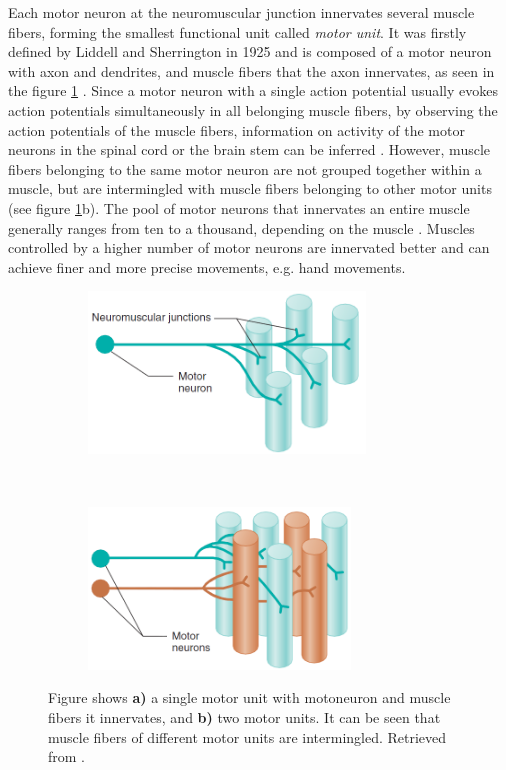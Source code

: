 Each motor neuron at the neuromuscular junction innervates several muscle fibers, forming the smallest functional unit called \emph{motor unit}. It was firstly defined by Liddell and Sherrington in 1925 \citep{Liddell1925, Sherrington1925} and is composed of a motor neuron with axon and dendrites, and muscle fibers that the axon innervates, as seen in the figure \ref{fig:motor units} \citep{Duchateau2011}. Since a motor neuron with a single action potential usually evokes action potentials simultaneously in all belonging muscle fibers, by observing the action potentials of the muscle fibers, information on activity of the motor neurons in the spinal cord or the brain stem can be inferred \citep{Merletti-Farina-book}. However, muscle fibers belonging to the same motor neuron are not grouped together within a muscle, but are intermingled with muscle fibers belonging to other motor units (see figure \ref{fig:motor units}b). The pool of motor neurons that innervates an entire muscle generally ranges from ten to a thousand, depending on the muscle \citep{Merletti-Farina-book}. Muscles controlled by a higher number of motor neurons are innervated better  and can achieve finer and more precise movements, e.g. hand movements.
\begin{figure}[htb!]
    \centering
    \begin{subfigure}[t]{0.49\textwidth}
        \centering
        \includegraphics[height=1.7in]{Images/introduction/one_MU.png}
        \caption{}
    \end{subfigure}%
    ~ 
    \begin{subfigure}[t]{0.49\textwidth}
        \centering
        \includegraphics[height=1.7in]{Images/introduction/two_MU.png}
        \caption{}
    \end{subfigure}
    \caption{Figure shows \textbf{a)} a single motor unit with motoneuron and muscle fibers it innervates, and \textbf{b)} two motor units. It can be seen that muscle fibers of different motor units are intermingled. Retrieved from \citet{Widmaier2014}.}
\label{fig:motor units}
\end{figure}


